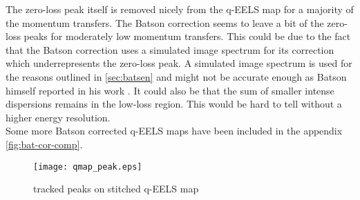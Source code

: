 \begin{multicols}{2}
	The zero-loss peak itself is removed nicely from the q-EELS map for a majority of the momentum transfers. The Batson correction seems to leave a bit of the zero-loss peaks for moderately low momentum transfers. This could be due to the fact that the Batson correction uses a simulated image spectrum for its correction which underrepresents the zero-loss peak. A simulated image spectrum is used for the reasons outlined in \ref{sec:batsen} and might not be accurate enough as Batson himself reported in his work \cite{PhysRevB.27.5224}. It could also be that the sum of smaller intense dispersions remains in the low-loss region. This would be hard to tell without a higher energy resolution.\\
	Some more Batson corrected q-EELS maps have been included in the appendix \ref{fig:bat-cor-comp}.
\end{multicols}
	\begin{figure}[t]
		\centering
		\texttt{[image: qmap\_peak.eps]}
		\caption{tracked peaks on stitched q-EELS map}
		\label{fig:qmap-track}
	\end{figure}
%
